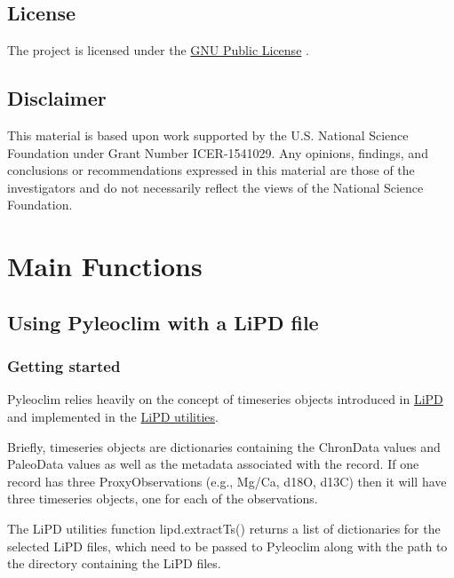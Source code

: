 \documentclass[letterpaper,10pt,english]{sphinxmanual}
\begin{document}
\section{License}
\label{\detokenize{Introduction:license}}
The project is licensed under the \href{https://github.com/LinkedEarth/Pyleoclim\_util/blob/master/license}{GNU Public License} .


\section{Disclaimer}
\label{\detokenize{Introduction:disclaimer}}
This material is based upon work supported by the U.S. National Science Foundation under Grant Number
ICER-1541029. Any opinions, findings, and conclusions or recommendations expressed in this material are those
of the investigators and do not necessarily reflect the views of the National Science Foundation.


\chapter{Main Functions}
\label{\detokenize{Main::doc}}\label{\detokenize{Main:main-functions}}

\section{Using Pyleoclim with a LiPD file}
\label{\detokenize{Main:using-pyleoclim-with-a-lipd-file}}

\subsection{Getting started}
\label{\detokenize{Main:getting-started}}
Pyleoclim relies heavily on the concept of timeseries objects introduced in
\href{http://www.clim-past.net/12/1093/2016/}{LiPD} and implemented in the
\href{http://nickmckay.github.io/LiPD-utilities/}{LiPD utilities}.

Briefly, timeseries objects are dictionaries containing the ChronData values and
PaleoData values as well as the metadata associated with the record. If one record
has three ProxyObservations (e.g., Mg/Ca, d18O, d13C) then it will have three timeseries
objects, one for each of the observations.

The LiPD utilities function lipd.extractTs() returns a list of dictionaries for
the selected LiPD files, which need to be passed to Pyleoclim along with the path
to the directory containing the LiPD files.
\end{document}
